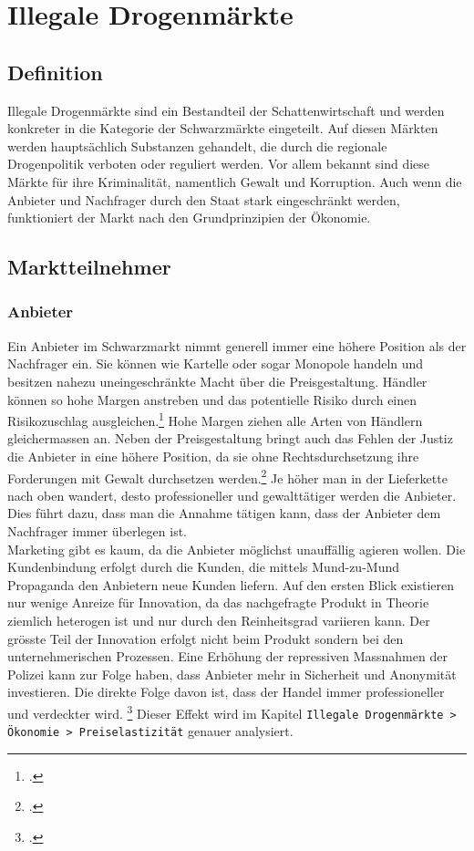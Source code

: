 \documentclass[../main.tex]{subfiles}
\begin{document}
 	\section{Illegale Drogenmärkte}
 	
 	\subsection{Definition}
 	
 	Illegale Drogenmärkte sind ein Bestandteil der Schattenwirtschaft und werden konkreter in die Kategorie der Schwarzmärkte eingeteilt.
 	Auf diesen Märkten werden hauptsächlich Substanzen gehandelt, die durch die regionale Drogenpolitik verboten oder reguliert werden.
 	Vor allem bekannt sind diese Märkte für ihre Kriminalität, namentlich Gewalt und Korruption.
 	Auch wenn die Anbieter und Nachfrager durch den Staat stark eingeschränkt werden, funktioniert der Markt nach den Grundprinzipien der Ökonomie.
 		
	
	\subsection{Marktteilnehmer}	
	
	\subsubsection{Anbieter}	
	Ein Anbieter im Schwarzmarkt nimmt generell immer eine höhere Position als der Nachfrager ein.
	Sie können wie Kartelle oder sogar Monopole handeln und besitzen nahezu uneingeschränkte Macht über die Preisgestaltung.
	Händler können so hohe Margen anstreben und das potentielle Risiko durch einen Risikozuschlag ausgleichen.\footcite{becker-2006}
	Hohe Margen ziehen alle Arten von Händlern gleichermassen an.
	Neben der Preisgestaltung bringt auch das Fehlen der Justiz die Anbieter in eine höhere Position, da sie ohne Rechtsdurchsetzung ihre Forderungen mit Gewalt durchsetzen werden.\footcite{departmentofjustice-1994}
	Je höher man in der Lieferkette nach oben wandert, desto professioneller und gewalttätiger werden die Anbieter. 
	Dies führt dazu, dass man die Annahme tätigen kann, dass der Anbieter dem Nachfrager immer überlegen ist.\\
	
	\noindent
	Marketing gibt es kaum, da die Anbieter möglichst unauffällig agieren wollen.
	Die Kundenbindung erfolgt durch die Kunden, die mittels Mund-zu-Mund Propaganda den Anbietern neue Kunden liefern.
	Auf den ersten Blick existieren nur wenige Anreize für Innovation, da das nachgefragte Produkt in Theorie ziemlich heterogen ist und nur durch den Reinheitsgrad variieren kann.		
	Der grösste Teil der Innovation erfolgt nicht beim Produkt sondern bei den unternehmerischen Prozessen. 
	Eine Erhöhung der repressiven Massnahmen der Polizei kann zur Folge haben, dass Anbieter mehr in Sicherheit und Anonymität investieren.
	Die direkte Folge davon ist, dass der Handel immer professioneller und verdeckter wird. \footcite{haucap-2018}
	Dieser Effekt wird im Kapitel \texttt{Illegale Drogenmärkte > Ökonomie > Preiselastizität} genauer analysiert.
	
\end{document}
